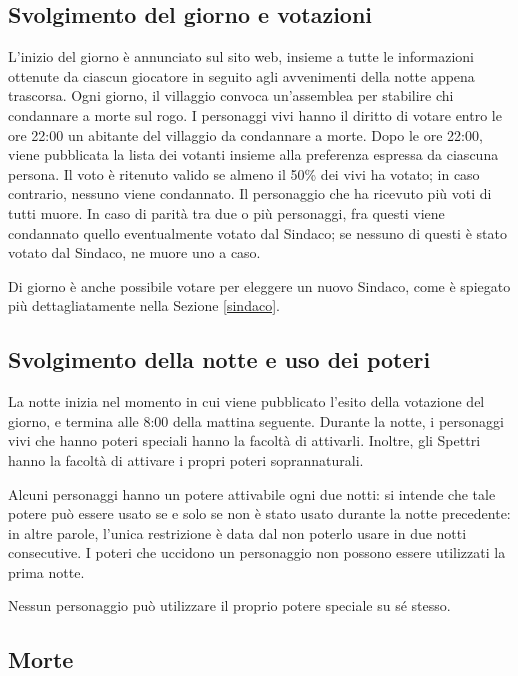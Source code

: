 \documentclass[a4paper,10pt]{article}
\begin{document}
\subsection{Svolgimento del giorno e votazioni}

L'inizio del giorno è annunciato sul sito web, insieme a tutte le informazioni ottenute da ciascun giocatore in seguito agli avvenimenti della notte appena trascorsa. Ogni giorno, il villaggio convoca un'assemblea per stabilire chi condannare a morte sul rogo. I personaggi vivi hanno il diritto di votare entro le ore 22:00 un abitante del villaggio da condannare a morte. Dopo le ore 22:00, viene pubblicata la lista dei votanti insieme alla preferenza espressa da ciascuna persona.
Il voto è ritenuto valido se almeno il 50\% dei vivi ha votato; in caso contrario, nessuno viene condannato. Il personaggio che ha ricevuto più voti di tutti muore.
In caso di parità tra due o più personaggi, fra questi viene condannato quello eventualmente votato dal Sindaco; se nessuno di questi è stato votato dal Sindaco, ne muore uno a caso.

Di giorno è anche possibile votare per eleggere un nuovo Sindaco, come è spiegato più dettagliatamente nella Sezione \ref{sindaco}.


\subsection{Svolgimento della notte e uso dei poteri}

La notte inizia nel momento in cui viene pubblicato l'esito della votazione del giorno, e termina alle 8:00 della mattina seguente. Durante la notte, i personaggi vivi che hanno poteri speciali hanno la facoltà di attivarli. Inoltre, gli Spettri hanno la facoltà di attivare i propri poteri soprannaturali.

Alcuni personaggi hanno un potere attivabile ogni due notti: si intende che tale potere può essere usato se e solo se non è stato usato durante la notte precedente: in altre parole, l'unica restrizione è data dal non poterlo usare in due notti consecutive. I poteri che uccidono un personaggio non possono essere utilizzati la prima notte.

Nessun personaggio può utilizzare il proprio potere speciale su sé stesso.


\subsection{Morte}
\end{document}
